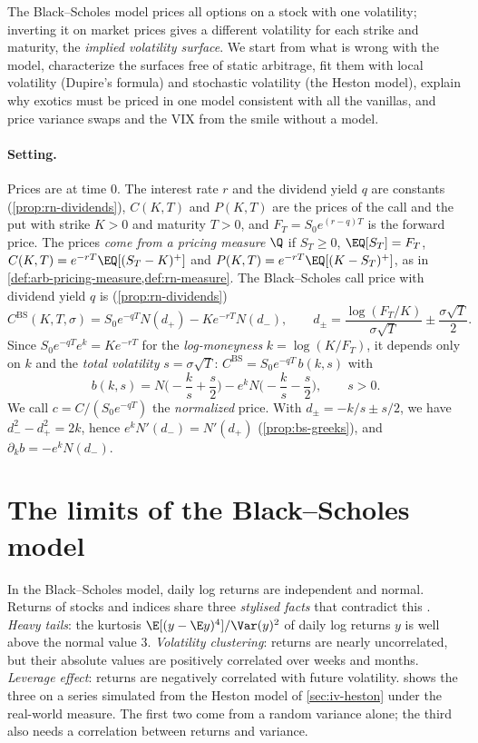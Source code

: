
The Black--Scholes model prices all options on a stock with one volatility; inverting it on market
prices gives a different volatility for each strike and maturity, the \emph{implied volatility
surface}. We start from what is wrong with the model, characterize the surfaces free of static
arbitrage, fit them with local volatility (Dupire's formula) and stochastic volatility (the Heston
model), explain why exotics must be priced in one model consistent with all the vanillas, and price
variance swaps and the VIX from the smile without a model.

\paragraph{Setting.} Prices are at time $0$. The interest rate $r$ and the dividend yield $q$ are
constants (\cref{prop:rn-dividends}), $C(K,T)$ and $P(K,T)$ are the prices of the call and the put
with strike $K>0$ and maturity $T>0$, and $F_T=S_0e^{(r-q)T}$ is the forward price. The prices
\emph{come from a pricing measure} $\Q$ if $S_T\ge0$, $\EQ[S_T]=F_T$,
$C(K,T)=e^{-rT}\EQ[(S_T-K)^+]$ and $P(K,T)=e^{-rT}\EQ[(K-S_T)^+]$, as in
\cref{def:arb-pricing-measure,def:rn-measure}. The Black--Scholes call price with dividend yield $q$
is (\cref{prop:rn-dividends})
\begin{equation}\label{eq:iv-bs}
  C^{\mathrm{BS}}(K,T,\sigma)=S_0e^{-qT}N(d_+)-Ke^{-rT}N(d_-),\qquad
  d_\pm=\frac{\log(F_T/K)}{\sigma\sqrt T}\pm\frac{\sigma\sqrt T}{2}.
\end{equation}
Since $S_0e^{-qT}e^k=Ke^{-rT}$ for the \emph{log-moneyness} $k=\log(K/F_T)$, it depends only on $k$
and the \emph{total volatility} $s=\sigma\sqrt T$: $C^{\mathrm{BS}}=S_0e^{-qT}\,b(k,s)$ with
\begin{equation}\label{eq:iv-b}
  b(k,s)=N\Big(-\frac ks+\frac s2\Big)-e^kN\Big(-\frac ks-\frac s2\Big),\qquad s>0 .
\end{equation}
We call $c=C/(S_0e^{-qT})$ the \emph{normalized} price. With $d_\pm=-k/s\pm s/2$, we have
$d_-^2-d_+^2=2k$, hence $e^kN'(d_-)=N'(d_+)$ (\cref{prop:bs-greeks}), and $\partial_kb=-e^kN(d_-)$.

\section{The limits of the Black--Scholes model}\label{sec:iv-limits}

In the Black--Scholes model, daily log returns are independent and normal. Returns of stocks and
indices share three \emph{stylised facts} that contradict this \citep{cont-stylized}.
\emph{Heavy tails}: the kurtosis $\E[(y-\E y)^4]/\Var(y)^2$ of daily log returns $y$ is well above the normal
value $3$. \emph{Volatility clustering}: returns are nearly uncorrelated, but their absolute values are
positively correlated over weeks and months. \emph{Leverage effect}: returns are negatively correlated
with future volatility.  shows the three on a series simulated from the Heston
model of \cref{sec:iv-heston} under the real-world measure. The first two come from a random variance
alone; the third also needs a correlation between returns and variance.

